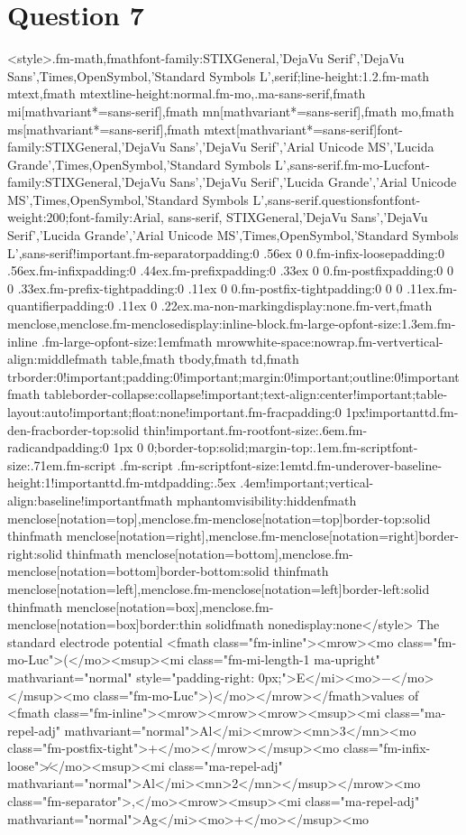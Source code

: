 \documentclass{article}
\begin{document}
\section*{Question 7}
<style>.fm-math,fmath{font-family:STIXGeneral,'DejaVu Serif','DejaVu Sans',Times,OpenSymbol,'Standard Symbols L',serif;line-height:1.2}.fm-math mtext,fmath mtext{line-height:normal}.fm-mo,.ma-sans-serif,fmath mi[mathvariant*=sans-serif],fmath mn[mathvariant*=sans-serif],fmath mo,fmath ms[mathvariant*=sans-serif],fmath mtext[mathvariant*=sans-serif]{font-family:STIXGeneral,'DejaVu Sans','DejaVu Serif','Arial Unicode MS','Lucida Grande',Times,OpenSymbol,'Standard Symbols L',sans-serif}.fm-mo-Luc{font-family:STIXGeneral,'DejaVu Sans','DejaVu Serif','Lucida Grande','Arial Unicode MS',Times,OpenSymbol,'Standard Symbols L',sans-serif}.questionsfont{font-weight:200;font-family:Arial, sans-serif, STIXGeneral,'DejaVu Sans','DejaVu Serif','Lucida Grande','Arial Unicode MS',Times,OpenSymbol,'Standard Symbols L',sans-serif!important}.fm-separator{padding:0 .56ex 0 0}.fm-infix-loose{padding:0 .56ex}.fm-infix{padding:0 .44ex}.fm-prefix{padding:0 .33ex 0 0}.fm-postfix{padding:0 0 0 .33ex}.fm-prefix-tight{padding:0 .11ex 0 0}.fm-postfix-tight{padding:0 0 0 .11ex}.fm-quantifier{padding:0 .11ex 0 .22ex}.ma-non-marking{display:none}.fm-vert,fmath menclose,menclose.fm-menclose{display:inline-block}.fm-large-op{font-size:1.3em}.fm-inline .fm-large-op{font-size:1em}fmath mrow{white-space:nowrap}.fm-vert{vertical-align:middle}fmath table,fmath tbody,fmath td,fmath tr{border:0!important;padding:0!important;margin:0!important;outline:0!important}fmath table{border-collapse:collapse!important;text-align:center!important;table-layout:auto!important;float:none!important}.fm-frac{padding:0 1px!important}td.fm-den-frac{border-top:solid thin!important}.fm-root{font-size:.6em}.fm-radicand{padding:0 1px 0 0;border-top:solid;margin-top:.1em}.fm-script{font-size:.71em}.fm-script .fm-script .fm-script{font-size:1em}td.fm-underover-base{line-height:1!important}td.fm-mtd{padding:.5ex .4em!important;vertical-align:baseline!important}fmath mphantom{visibility:hidden}fmath menclose[notation=top],menclose.fm-menclose[notation=top]{border-top:solid thin}fmath menclose[notation=right],menclose.fm-menclose[notation=right]{border-right:solid thin}fmath menclose[notation=bottom],menclose.fm-menclose[notation=bottom]{border-bottom:solid thin}fmath menclose[notation=left],menclose.fm-menclose[notation=left]{border-left:solid thin}fmath menclose[notation=box],menclose.fm-menclose[notation=box]{border:thin solid}fmath none{display:none}</style> The standard electrode potential <fmath class="fm-inline"><mrow><mo class="fm-mo-Luc">(</mo><msup><mi class="fm-mi-length-1 ma-upright" mathvariant="normal" style="padding-right: 0px;">E</mi><mo>−</mo></msup><mo class="fm-mo-Luc">)</mo></mrow></fmath>values of <fmath class="fm-inline"><mrow><mrow><mrow><msup><mi class="ma-repel-adj" mathvariant="normal">Al</mi><mrow><mn>3</mn><mo class="fm-postfix-tight">+</mo></mrow></msup><mo class="fm-infix-loose">∕</mo><msup><mi class="ma-repel-adj" mathvariant="normal">Al</mi><mn>2</mn></msup></mrow><mo class="fm-separator">,</mo><mrow><msup><mi class="ma-repel-adj" mathvariant="normal">Ag</mi><mo>+</mo></msup><mo 
\end{document}
